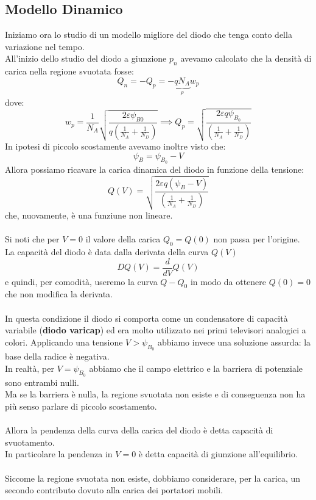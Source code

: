 \documentclass[../main.tex]{subfiles}
\begin{document}
	\subsection{Modello Dinamico}
	Iniziamo ora lo studio di un modello migliore del diodo che tenga conto della variazione nel tempo. \\
	All’inizio dello studio del diodo a giunzione $p_n$ avevamo calcolato che la densità di carica nella regione svuotata fosse:
	$$Q_n = -Q_p = -\underbrace{qN_A}_{\rho} w_p$$
	dove:
	$$w_p = \frac{1}{N_A} \sqrt{\frac{2\varepsilon\psi_{B0}}{q\left(\frac{1}{N_A} + \frac{1}{N_D}\right)}} \implies Q_p = \sqrt{\frac{2\varepsilon q\psi_{B_0}}{\left(\frac{1}{N_A} + \frac{1}{N_D}\right)}}$$
	In ipotesi di piccolo scostamente avevamo inoltre visto che:
	$$\psi_B = \psi_{B_0} - V$$
	Allora possiamo ricavare la carica dinamica del diodo in funzione della tensione:
	$$Q(V) = \sqrt{\frac{2\varepsilon q(\psi_B - V)}{\left(\frac{1}{N_A} + \frac{1}{N_D}\right)}}$$
	che, nuovamente, è una funziune non lineare.\\\\
	Si noti che per $V = 0$ il valore della carica $Q_0 = Q(0)$ non passa per l’origine. \\
	La capacità del diodo è data dalla derivata della curva $Q(V)$
	$$DQ(V) = \frac{d}{dV}Q(V)$$
	e quindi, per comodità, useremo la curva $Q - Q_0$ in modo da ottenere $Q(0) = 0$ che non modifica la derivata.\\\\
	In questa condizione il diodo si comporta come un condensatore di capacità variabile (\textbf{diodo varicap}) ed era molto utilizzato nei primi televisori analogici a colori.
	Applicando una tensione $V > \psi_{B_0}$ abbiamo invece una soluzione assurda: la base della radice è negativa. \\
	In realtà, per $V = \psi_{B_0}$ abbiamo che il campo elettrico e la barriera di potenziale sono entrambi nulli. \\
	Ma se la barriera è nulla, la regione svuotata non esiste e di conseguenza non ha più senso parlare di piccolo scostamento.\\\\
	Allora la pendenza della curva della carica del diodo è detta capacità di svuotamento. \\
	In particolare la pendenza in $V = 0$ è detta capacità di giunzione all’equilibrio.\\\\
	Siccome la regione svuotata non esiste, dobbiamo considerare, per la carica, un secondo contributo dovuto alla carica dei portatori mobili. \\
\end{document}
